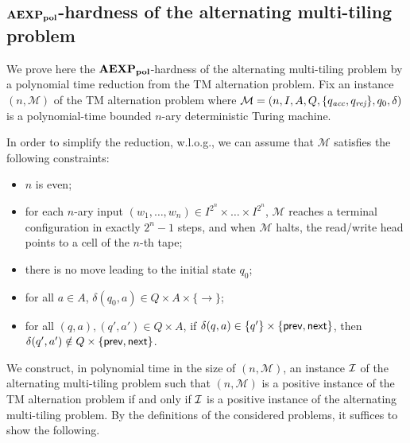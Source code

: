 \subsection{$\mathbf{AEXP_{pol}}$-hardness of the alternating multi-tiling problem}
We prove here the $\mathbf{AEXP_{pol}}$-hardness of the alternating multi-tiling problem by a polynomial time reduction from the TM alternation problem.
Fix an instance $(n,\mathcal{M})$ of the TM alternation problem  where   $\mathcal{M}=(n,I,A,Q, \{q_{\textit{acc}},q_{\textit{rej}}\},q_0,\delta)$
is a  polynomial-time bounded  $n$-ary deterministic Turing machine.


\begin{remark}\label{rem:assumptions}
In order to simplify the reduction, w.l.o.g., we can assume that $\mathcal{M}$ satisfies the following constraints:
\begin{itemize}
\item $n$ is even;
  \item for each $n$-ary input $(w_1,\ldots,w_n)\in I^{2^{n}}\times \ldots \times I^{2^{n}}$, $\mathcal{M}$ reaches a terminal configuration in exactly $2^{n}-1$ steps, and when  $\mathcal{M}$ halts, the read/write head points to a cell of the $n$-th tape;
  \item  there is no move leading to the initial state $q_0$;
  \item for all $a\in A$, $\delta(q_0,a)\in Q\times A\times \{\rightarrow\}$;
  \item for all $(q,a),(q',a')\in Q\times A$, if $\delta(q,a)\in \{q'\}\times \{\text{{\sffamily prev}},\text{{\sffamily next}}\}$, then $\delta(q',a')\notin Q\times \{\text{{\sffamily prev}},\text{{\sffamily next}}\}$.
\end{itemize}
\end{remark}

We construct, in polynomial time in the size of $(n,\mathcal{M})$, an instance $\mathcal{I}$ of the alternating multi-tiling problem
such that $(n,\mathcal{M})$ is a positive instance of the TM alternation problem if and only if $\mathcal{I}$ is a positive instance of the alternating multi-tiling problem.
By the definitions of the considered problems, it suffices to show the following.

